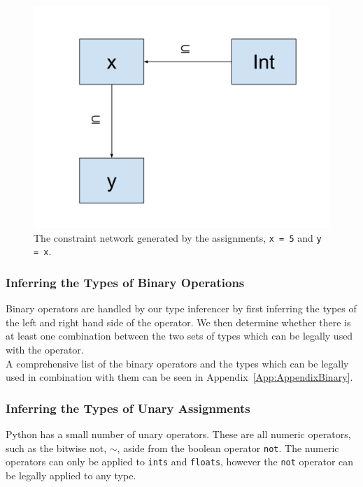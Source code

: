 \documentclass[12pt, titlepage]{article}
\begin{document}
\begin{figure}
\centering
\includegraphics[scale=0.3]{images/assignment_constraint.pdf}
\caption{The constraint network generated by the assignments, \texttt{x = 5} and \texttt{y = x}.}
\label{figure:assignConstraint}
\end{figure}

\subsubsection{Inferring the Types of Binary Operations}
Binary operators are handled by our type inferencer by first inferring the types of the left and right hand side of the operator. We then determine whether there is at least one combination between the two sets of types which can be legally used with the operator. \\
A comprehensive list of the binary operators and the types which can be legally used in combination with them can be seen in Appendix~\ref{App:AppendixBinary}.


\subsubsection{Inferring the Types of Unary Assignments}
Python has a small number of unary operators. These are all numeric operators, such as the bitwise not, $\sim$, aside from the boolean operator \texttt{not}. The numeric operators can only be applied to \texttt{ints} and \texttt{floats}, however the \texttt{not} operator can be legally applied to any type.
\end{document}
